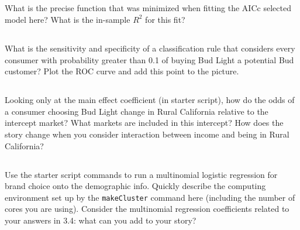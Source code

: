 \documentclass[12pt]{article}
\begin{document}
\subsection{} What is the precise function that was minimized when fitting the AICc selected model here?  What is the in-sample $R^2$ for this fit?

\subsection{} What is the sensitivity and specificity of a classification rule that considers every consumer with probability greater than 0.1 of buying Bud Light a potential Bud customer?  Plot the ROC curve and add this point to the picture.

\subsection{} Looking only at the main effect coefficient (in starter script), how do the odds of a consumer choosing Bud Light change in Rural California relative to the intercept market?   What markets are included in this intercept?  How does the story change when you consider interaction between income and being in Rural California? 

\subsection{} Use the starter script commands to run a multinomial logistic regression for brand choice onto the demographic info.  Quickly describe the computing environment set up by the {\tt makeCluster} command here (including the number of cores you are using).  Consider the multinomial regression coefficients related to your answers in 3.4: what can you add to your story?
\end{document}
